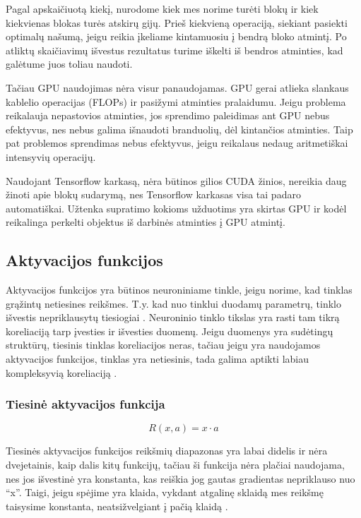 \documentclass{VUMIFInfKursinis}
\begin{document}
Pagal apskaičiuotą kiekį, nurodome kiek mes norime turėti blokų ir kiek kiekvienas blokas
turės atskirų gijų. Prieš kiekvieną operaciją, siekiant pasiekti optimalų našumą, jeigu
reikia įkeliame kintamuosiu į bendrą bloko atmintį. Po atliktų skaičiavimų išvestus
rezultatus turime iškelti iš bendros atminties, kad galėtume juos toliau naudoti.
\par
Tačiau GPU naudojimas nėra visur panaudojamas. GPU gerai atlieka slankaus kablelio
operacijas (FLOPs) ir pasižymi atminties pralaidumu. Jeigu problema reikalauja nepastovios atminties,
jos sprendimo paleidimas ant GPU nebus efektyvus, nes nebus galima išnaudoti branduolių,
dėl kintančios atminties. Taip pat problemos sprendimas nebus efektyvus, jeigu
reikalaus nedaug aritmetiškai intensyvių operacijų.
\par
Naudojant Tensorflow karkasą, nėra būtinos gilios CUDA žinios, nereikia daug žinoti apie blokų sudarymą, nes Tensorflow karkasas visa tai padaro automatiškai. Užtenka supratimo kokioms užduotims yra skirtas GPU ir kodėl reikalinga perkelti objektus iš darbinės atminties į GPU atmintį.

\subsection{Aktyvacijos funkcijos}
\par
Aktyvacijos funkcijos yra būtinos neuroniniame tinkle, jeigu norime, kad tinklas
grąžintų netiesines reikšmes. T.y. kad nuo tinklui duodamų parametrų, tinklo išvestis
nepriklausytų tiesiogiai \cite{salt18}. Neuroninio tinklo tikslas yra rasti tam tikrą
koreliaciją tarp įvesties ir išvesties duomenų. Jeigu duomenys yra sudėtingų struktūrų,
tiesinis tinklas koreliacijos neras, tačiau jeigu yra naudojamos aktyvacijos funkcijos,
tinklas yra netiesinis, tada galima aptikti labiau kompleksyvią koreliaciją \cite{salt18}.

\subsubsection{Tiesinė aktyvacijos funkcija}
\begin{equation}\label{eqn:lygtis}
R(x, a) = x \cdot a
\end{equation}
\par
Tiesinės aktyvacijos funkcijos reikšmių diapazonas yra labai didelis ir nėra dvejetainis,
kaip dalis kitų funkcijų, tačiau ši funkcija nėra plačiai naudojama, nes jos
išvestinė yra konstanta, kas reiškia jog gautas gradientas nepriklauso nuo \enquote{x}.
Taigi, jeigu spėjime yra klaida, vykdant atgalinę sklaidą mes reikšmę taisysime
konstanta, neatsižvelgiant į pačią klaidą \cite{salt16}.
\end{document}
